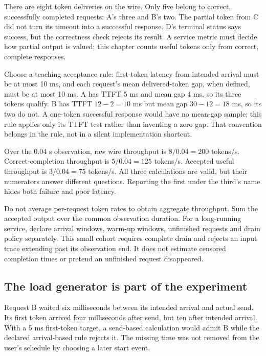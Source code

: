 There are eight token deliveries on the wire. Only five belong to
correct, successfully completed requests: A's three and B's two.
The partial token from C did not turn its timeout into a successful
response. D's terminal status says success, but the correctness check
rejects its result. A service metric must decide how partial output
is valued; this chapter counts useful tokens only from correct,
complete responses.

Choose a teaching acceptance rule: first-token latency from intended
arrival must be at most 10 ms, and each request's mean delivered-token
gap, when defined, must be at most 10 ms. A has TTFT 5 ms and mean
gap 4 ms, so its three tokens qualify. B has TTFT $12-2=10$ ms
but mean gap $30-12=18$ ms, so its two do not. A one-token successful
response would have no mean-gap sample; this rule applies only its
TTFT test rather than inventing a zero gap. That convention belongs
in the rule, not in a silent implementation shortcut.

Over the 0.04 s observation, raw wire throughput is
$8/0.04=200$ tokens/s. Correct-completion throughput is
$5/0.04=125$ tokens/s. Accepted useful throughput is
$3/0.04=75$ tokens/s. All three calculations are valid, but their
numerators answer different questions. Reporting the first under
the third's name hides both failure and poor latency.


Do not average per-request token rates to obtain aggregate throughput.
Sum the accepted output over the common observation duration.
For a long-running service, declare arrival windows, warm-up windows,
unfinished requests and drain policy separately. This small cohort
requires complete drain and rejects an input trace extending past
its observation end. It does not estimate censored completion times
or pretend an unfinished request disappeared.

\subsection{The load generator is part of the experiment}
Request B waited six milliseconds between its intended arrival and
actual send. Its first token arrived four milliseconds after send,
but ten after intended arrival. With a 5 ms first-token target,
a send-based calculation would admit B while the declared
arrival-based rule rejects it. The missing time was not removed
from the user's schedule by choosing a later start event.


